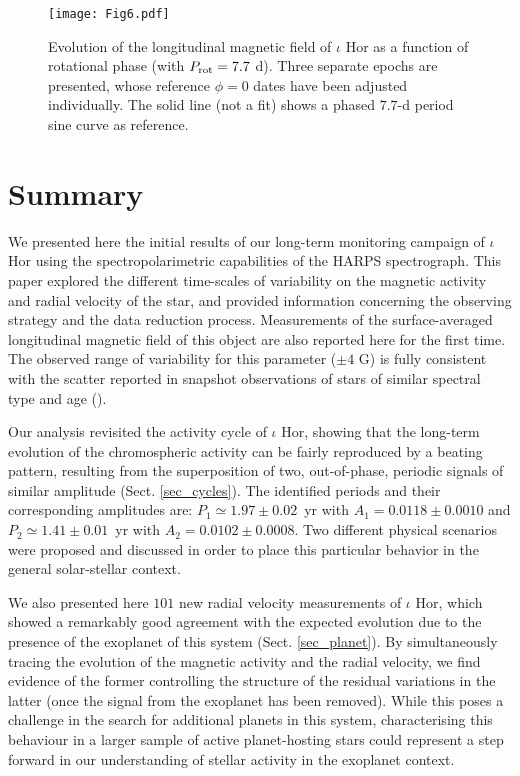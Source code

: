 \documentclass[a4paper,fleqn,usenatbib]{mnras}
\begin{document}
\begin{figure} %
\texttt{[image: Fig6.pdf]}
\caption{Evolution of the longitudinal magnetic field of $\iota$ Hor as a function of rotational phase (with $P_{\rm rot} = 7.7$ d). Three separate epochs are presented, whose reference $\phi = 0$ dates have been adjusted individually. The solid line (not a fit) shows a phased $7.7$-d period sine curve as reference.}\label{fig_7}
\end{figure}

\section{Summary}\label{sect_6}

We presented here the initial results of our long-term monitoring campaign of $\iota$ Hor using the spectropolarimetric capabilities of the HARPS spectrograph. This paper explored the different time-scales of variability on the magnetic activity and radial velocity of the star, and provided information concerning the observing strategy and the data reduction process. Measurements of the surface-averaged longitudinal magnetic field of this object are also reported here for the first time. The observed range of variability for this parameter ($\pm4$ G) is fully consistent with the scatter reported in snapshot observations of stars of similar spectral type and age ().          

Our analysis revisited the activity cycle of $\iota$ Hor, showing that the long-term evolution of the chromospheric activity can be fairly reproduced by a beating pattern, resulting from the superposition of two, out-of-phase, periodic signals of similar amplitude (Sect. \ref{sec_cycles}). The identified periods and their corresponding amplitudes are: $P_{1} \simeq 1.97 \pm 0.02$~yr with $A_{1} = 0.0118 \pm 0.0010$ and $P_{2} \simeq 1.41 \pm 0.01$~yr with $A_{2} = 0.0102 \pm 0.0008$. Two different physical scenarios were proposed and discussed in order to place this particular behavior in the general solar-stellar context.  

We also presented here $101$ new radial velocity measurements of $\iota$ Hor, which showed a remarkably good agreement with the expected evolution due to the presence of the exoplanet of this system (Sect. \ref{sec_planet}). By simultaneously tracing the evolution of the magnetic activity and the radial velocity, we find evidence of the former controlling the structure of the residual variations in the latter (once the signal from the exoplanet has been removed). While this poses a challenge in the search for additional planets in this system, characterising this behaviour in a larger sample of active planet-hosting stars could represent a step forward in our understanding of stellar activity in the exoplanet context.
\end{document}
